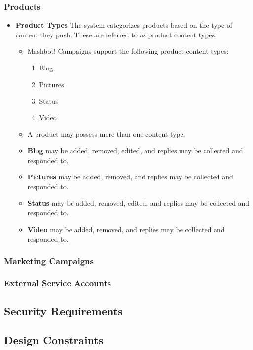 \documentclass{article}
\begin{document}
		\subsubsection{Products} %
			\begin{itemize}
				\item \textbf{Product Types} The system categorizes products based on the type of content they push.
			 		These are referred to as product content types.
				\begin{itemize}
					\item Mashbot! Campaigns support the following product content types:
						\begin{enumerate}
							\item Blog
							\item Pictures
							\item Status
							\item Video
						\end{enumerate}
					\item A product may possess more than one content type.
					\item \textbf{Blog} may be added, removed, edited, and replies may be collected and responded to. 
					\item \textbf{Pictures} may be added, removed, and replies may be collected and responded to.
					\item \textbf{Status} may be added, removed, edited, and replies may be collected and responded to. 
					\item \textbf{Video} may be added, removed, and replies may be collected and responded to.
				\end{itemize}	
			\end{itemize}
		\subsubsection{Marketing Campaigns} %
		\subsubsection{External Service Accounts} %

	\subsection{Security Requirements} %
	\subsection{Design Constraints} %
\end{document}
